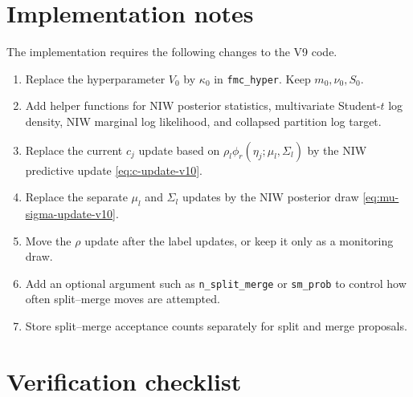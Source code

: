 \documentclass[11pt]{article}
\begin{document}
\section{Implementation notes}

The implementation requires the following changes to the V9 code.

\begin{enumerate}[leftmargin=2em]
    \item Replace the hyperparameter $V_0$ by $\kappa_0$ in
    \texttt{fmc\_hyper}.  Keep $m_0,\nu_0,S_0$.
    \item Add helper functions for NIW posterior statistics,
    multivariate Student-$t$ log density, NIW marginal log likelihood, and
    collapsed partition log target.
    \item Replace the current $c_j$ update based on
    $\rho_l\phi_r(\eta_j;\mu_l,\Sigma_l)$ by the NIW predictive update
    \eqref{eq:c-update-v10}.
    \item Replace the separate $\mu_l$ and $\Sigma_l$ updates by the NIW
    posterior draw \eqref{eq:mu-sigma-update-v10}.
    \item Move the $\rho$ update after the label updates, or keep it only as
    a monitoring draw.
    \item Add an optional argument such as \texttt{n\_split\_merge} or
    \texttt{sm\_prob} to control how often split--merge moves are attempted.
    \item Store split--merge acceptance counts separately for split and merge
    proposals.
\end{enumerate}

\section{Verification checklist}
\end{document}

